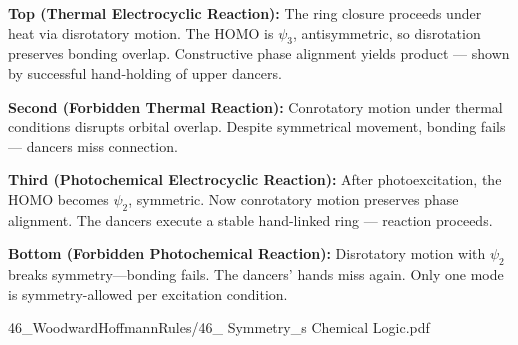 \begin{SideNotePage}{
  \textbf{Top (Thermal Electrocyclic Reaction):}  
  The ring closure proceeds under heat via disrotatory motion. The HOMO is $\psi_3$, antisymmetric, so disrotation preserves bonding overlap. Constructive phase alignment yields product — shown by successful hand-holding of upper dancers. \par

  \textbf{Second (Forbidden Thermal Reaction):}  
  Conrotatory motion under thermal conditions disrupts orbital overlap. Despite symmetrical movement, bonding fails — dancers miss connection. \par

  \textbf{Third (Photochemical Electrocyclic Reaction):}  
  After photoexcitation, the HOMO becomes $\psi_2$, symmetric. Now conrotatory motion preserves phase alignment. The dancers execute a stable hand-linked ring — reaction proceeds. \par

  \textbf{Bottom (Forbidden Photochemical Reaction):}  
  Disrotatory motion with $\psi_2$ breaks symmetry—bonding fails. The dancers’ hands miss again. Only one mode is symmetry-allowed per excitation condition. \par
}{46_WoodwardHoffmannRules/46_ Symmetry_s Chemical Logic.pdf}
\end{SideNotePage}
